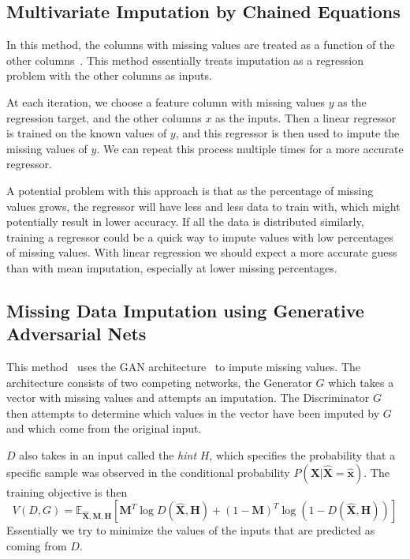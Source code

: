 \documentclass[12pt]{article}
\begin{document}
\subsection{Multivariate Imputation by Chained Equations}
In this method, the columns with missing values are treated as a 
function of the other columns~\cite{pedregosa2011scikit}.
This method essentially treats imputation as a regression problem
with the other columns as inputs.

At each iteration, we choose a feature column with missing values $y$
as the regression target, and the other columns $x$ as the inputs.
Then a linear regressor is trained on the known values of $y$,
and this regressor is then used to impute the missing values of $y$.
We can repeat this process multiple times for a more accurate regressor.

A potential problem with this approach is that as the percentage of 
missing values grows, the regressor will have less and less data to 
train with, which might potentially result in lower accuracy.
If all the data is distributed similarly, training a regressor
could be a quick way to impute values with low percentages of 
missing values.
With linear regression we should expect a more accurate guess than 
with mean imputation, especially at lower missing percentages.

\subsection{Missing Data Imputation using Generative Adversarial Nets}
This method~\cite{yoon2018gain} uses the GAN architecture~\cite{goodfellow2014generative} 
to impute missing values.
The architecture consists of two competing networks, the Generator $G$
which takes a vector with missing values and attempts an imputation.
The Discriminator $G$ then attempts to determine which values in the 
vector have been imputed by $G$ and which come from the original input.

$D$ also takes in an input called the \emph{hint} $H$, which specifies
the probability that a specific sample was observed in the conditional
probability $P(\boldsymbol{X}|\hat{\boldsymbol{X}} = \hat{\boldsymbol{x}})$.
The training objective is then 
\[V(D, G) = \mathbb{E}_{\hat{\boldsymbol{X}}, \boldsymbol{M}, \boldsymbol{H}}
[\boldsymbol{M}^T\log D(\hat{\boldsymbol{X}},\boldsymbol{H}) + (1-\boldsymbol{M})^T
\log(1-D(\hat{\boldsymbol{X}}, \boldsymbol{H}))]\]
Essentially we try to minimize the values of the inputs that are predicted as coming
from $D$.
\end{document}
